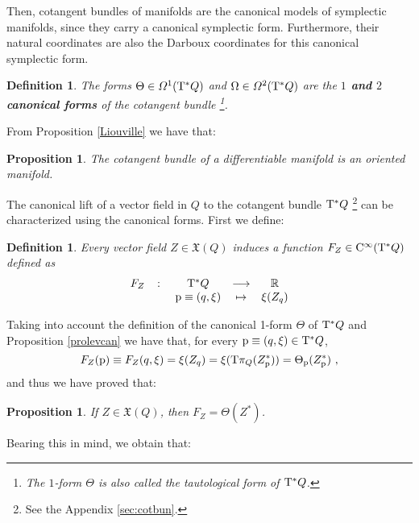 \documentclass[12pt]{report}
\newtheorem{prop}[teor]{Proposition}
\newtheorem{definition}[teor]{Definition}
\def\vf{\mathfrak X}
\def\Real{\mathbb{R}}
\def\Tan{{\rm T}}
\def\Cinfty{{\rm C}^\infty}
\begin{document}
Then, cotangent bundles of manifolds are the canonical models of symplectic manifolds, since they carry a canonical symplectic form.
Furthermore,  their natural coordinates are also the Darboux coordinates
for this canonical symplectic form.

\begin{definition}
The forms $\Theta \in {\mit\Omega}^1(\Tan^*Q)$
and $\Omega \in {\mit\Omega}^2(\Tan^*Q)$ are the
\textbf{$1$ and $2$ canonical forms} of the cotangent bundle
\footnote{ The $1$-form $\Theta$ is also called the {\sl tautological form} of $\Tan^*Q$.}.
\end{definition}

From Proposition \ref{Liouville} we have that:

\begin{prop}
The cotangent bundle of a differentiable manifold is an
{\sl oriented} manifold.
\end{prop}

The canonical lift of a vector field in $Q$ to the cotangent bundle $\Tan^*Q$
\footnote{
See the Appendix \ref{sec:cotbun}.}
can be characterized using the canonical forms. First we define:

\begin{definition}
Every vector field $Z\in\vf (Q)$
induces a function $F_Z\in\Cinfty (\Tan^*Q)$ defined as
$$
\begin{array}{ccccc}
F_Z&\colon&\Tan^*Q&\longrightarrow&\Real
\\
& &{\rm p}\equiv (q,\xi ) & \mapsto & \xi (Z_q)
\end{array}
$$
\end{definition}

Taking into account the definition of the canonical  1-form
$\Theta$ of $\Tan^*Q$ and Proposition \ref{prolevcan}
we have that, for every ${\rm p}\equiv (q,\xi)\in\Tan^*Q$,
$$
F_Z({\rm p})\equiv F_Z(q,\xi)=\xi (Z_q)=\xi (\Tan \pi_Q (Z^*_{\rm p}))=\Theta_{\rm p}(Z^*_{\rm p}) \ ,
$$
and thus we have proved that:

\begin{prop}
If $Z\in\vf (Q)$,  then $F_Z=\Theta (Z^*)$.
\end{prop}

Bearing this in mind, we obtain that:
\end{document}
